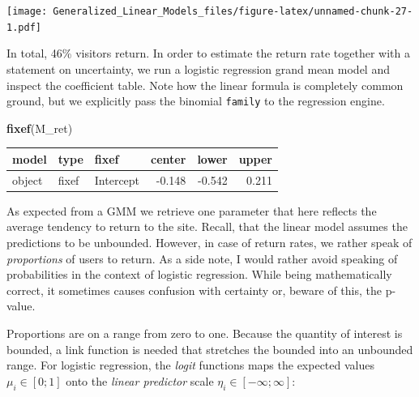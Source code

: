 \documentclass[]{svmono}
\newenvironment{Shaded}{\begin{snugshade}}{\end{snugshade}}
\newcommand{\KeywordTok}[1]{\textcolor[rgb]{0.13,0.29,0.53}{\textbf{#1}}}
\newcommand{\DataTypeTok}[1]{\textcolor[rgb]{0.13,0.29,0.53}{#1}}
\newcommand{\DecValTok}[1]{\textcolor[rgb]{0.00,0.00,0.81}{#1}}
\newcommand{\StringTok}[1]{\textcolor[rgb]{0.31,0.60,0.02}{#1}}
\newcommand{\CommentTok}[1]{\textcolor[rgb]{0.56,0.35,0.01}{\textit{#1}}}
\newcommand{\OperatorTok}[1]{\textcolor[rgb]{0.81,0.36,0.00}{\textbf{#1}}}
\newcommand{\NormalTok}[1]{#1}
\theoremstyle{definition}
\theoremstyle{definition}
\theoremstyle{definition}
\theoremstyle{remark}
\begin{document}
\texttt{[image: Generalized\_Linear\_Models\_files/figure-latex/unnamed-chunk-27-1.pdf]}

In total, 46\% visitors return. In order to estimate the return rate
together with a statement on uncertainty, we run a logistic regression
grand mean model and inspect the coefficient table. Note how the linear
formula is completely common ground, but we explicitly pass the binomial
\texttt{family} to the regression engine.

\begin{Shaded}
\end{Shaded}

\begin{Shaded}
\begin{Highlighting}[]
\KeywordTok{fixef}\NormalTok{(M_ret)}
\end{Highlighting}
\end{Shaded}

\begin{longtable}[]{@{}lllrrr@{}}
\toprule
model & type & fixef & center & lower & upper\tabularnewline
\midrule
\endhead
object & fixef & Intercept & -0.148 & -0.542 & 0.211\tabularnewline
\bottomrule
\end{longtable}

As expected from a GMM we retrieve one parameter that here reflects the
average tendency to return to the site. Recall, that the linear model
assumes the predictions to be unbounded. However, in case of return
rates, we rather speak of \emph{proportions} of users to return. As a
side note, I would rather avoid speaking of probabilities in the context
of logistic regression. While being mathematically correct, it sometimes
causes confusion with certainty or, beware of this, the p-value.

Proportions are on a range from zero to one. Because the quantity of
interest is bounded, a link function is needed that stretches the
bounded into an unbounded range. For logistic regression, the
\emph{logit} functions maps the expected values \(\mu_i \in [0;1]\) onto
the \emph{linear predictor} scale \(\eta_i \in [-\infty; \infty]\):
\end{document}
